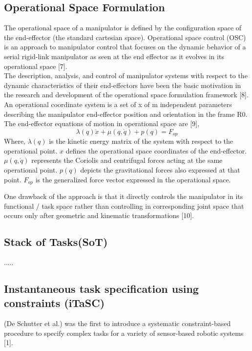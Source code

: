 \subsection{Operational Space Formulation}
The operational space of a manipulator is defined by the configuration space of the end-effector (the standard cartesian space). Operational space control (OSC) is an approach to manipulator control that focuses on the dynamic behavior of a serial rigid-link manipulator as seen at the end effector as it evolves in its operational space [7]. \\ The description, analysis, and control of manipulator systems with respect to the dynamic characteristics of their end-effectors have been the basic motivation in the research and development of the operational space formulation framework [8]. \\ An operational coordinate system is a set of x of m independent parameters describing the manipulator end-effector position and orientation in the frame R0. The end-effector equations of motion in operational space are [9],\\
\textbf{$$ \lambda(q) \ddot{x} + \mu (q, \dot q) + p(q) = F_{op} $$}
Where, $\lambda (q)$ is the kinetic energy matrix of the system with respect to the operational point. $x$ defines the operational space coordinates of the end-effector.\\	
$\mu (q, \dot q)$ represents the Coriolis and centrifugal forces acting at the same operational point. $p(q)$ depicts the gravitational forces also expressed at that point.	$F_{op}$ is the generalized force vector expressed in the operational space.


One drawback of the approach is that it directly controls the manipulator in its functional / task space rather than controlling in corresponding joint space that occurs only after geometric and kinematic transformations [10].

\subsection{Stack of Tasks(SoT)}{.....}

\subsection{Instantaneous task specification using constraints (iTaSC)}
(De Schutter et al.) was the first to introduce a systematic constraint-based procedure to specify complex tasks for a variety of sensor-based robotic systems [1].

